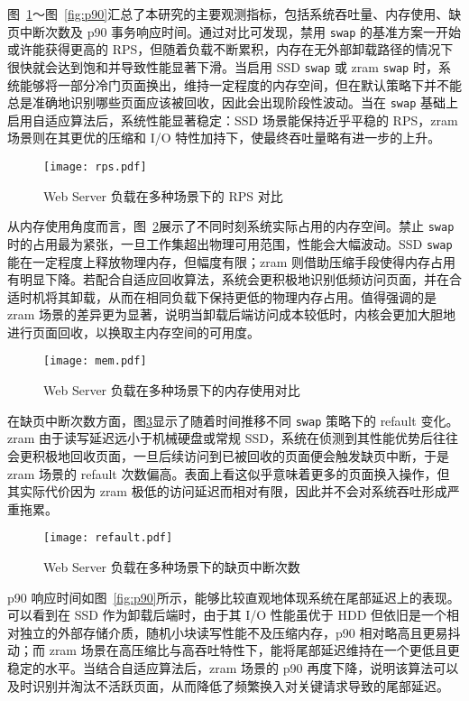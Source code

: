 图~\ref{fig:rps}～图~\ref{fig:p90}汇总了本研究的主要观测指标，包括系统吞吐量、内存使用、缺页中断次数及 p90 事务响应时间。通过对比可发现，禁用 \texttt{swap} 的基准方案一开始或许能获得更高的 RPS，但随着负载不断累积，内存在无外部卸载路径的情况下很快就会达到饱和并导致性能显著下滑。当启用 SSD \texttt{swap} 或 zram \texttt{swap} 时，系统能够将一部分冷门页面换出，维持一定程度的内存空间，但在默认策略下并不能总是准确地识别哪些页面应该被回收，因此会出现阶段性波动。当在 \texttt{swap} 基础上启用自适应算法后，系统性能显著稳定：SSD 场景能保持近乎平稳的 RPS，zram 场景则在其更优的压缩和 I/O 特性加持下，使最终吞吐量略有进一步的上升。

\begin{figure}[h]
    \centering
    \texttt{[image: rps.pdf]}
    \caption{Web Server 负载在多种场景下的 RPS 对比}
    \label{fig:rps}
\end{figure}

从内存使用角度而言，图~\ref{fig:mem}展示了不同时刻系统实际占用的内存空间。禁止 \texttt{swap} 时的占用最为紧张，一旦工作集超出物理可用范围，性能会大幅波动。SSD \texttt{swap} 能在一定程度上释放物理内存，但幅度有限；zram 则借助压缩手段使得内存占用有明显下降。若配合自适应回收算法，系统会更积极地识别低频访问页面，并在合适时机将其卸载，从而在相同负载下保持更低的物理内存占用。值得强调的是 zram 场景的差异更为显著，说明当卸载后端访问成本较低时，内核会更加大胆地进行页面回收，以换取主内存空间的可用度。

\begin{figure}[h]
    \centering
    \texttt{[image: mem.pdf]}
    \caption{Web Server 负载在多种场景下的内存使用对比}
    \label{fig:mem}
\end{figure}

在缺页中断次数方面，图\ref{fig:refault}显示了随着时间推移不同 \texttt{swap} 策略下的 refault 变化。zram 由于读写延迟远小于机械硬盘或常规 SSD，系统在侦测到其性能优势后往往会更积极地回收页面，一旦后续访问到已被回收的页面便会触发缺页中断，于是 zram 场景的 refault 次数偏高。表面上看这似乎意味着更多的页面换入操作，但其实际代价因为 zram 极低的访问延迟而相对有限，因此并不会对系统吞吐形成严重拖累。

\begin{figure}[h]
    \centering
    \texttt{[image: refault.pdf]}
    \caption{Web Server 负载在多种场景下的缺页中断次数}
    \label{fig:refault}
\end{figure}

p90 响应时间如图~\ref{fig:p90}所示，能够比较直观地体现系统在尾部延迟上的表现。可以看到在 SSD 作为卸载后端时，由于其 I/O 性能虽优于 HDD 但依旧是一个相对独立的外部存储介质，随机小块读写性能不及压缩内存，p90 相对略高且更易抖动；而 zram 场景在高压缩比与高吞吐特性下，能将尾部延迟维持在一个更低且更稳定的水平。当结合自适应算法后，zram 场景的 p90 再度下降，说明该算法可以及时识别并淘汰不活跃页面，从而降低了频繁换入对关键请求导致的尾部延迟。

